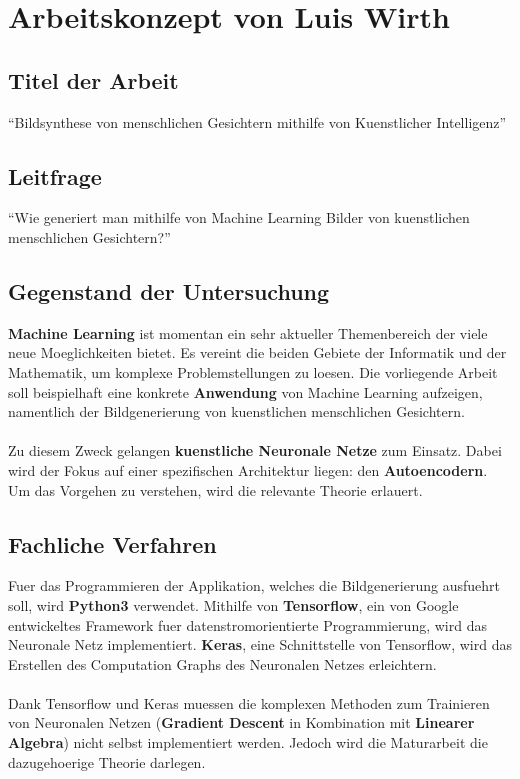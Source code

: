 \documentclass[12pt, a4paper]{article}
\begin{document}
\section*{Arbeitskonzept von Luis Wirth}

\subsection*{Titel der Arbeit}
``Bildsynthese von menschlichen Gesichtern mithilfe von Kuenstlicher Intelligenz''

\subsection*{Leitfrage}
``Wie generiert man mithilfe von Machine Learning Bilder von kuenstlichen menschlichen Gesichtern?''

\subsection*{Gegenstand der Untersuchung}
\textbf{Machine Learning} ist momentan ein sehr aktueller Themenbereich der viele neue Moeglichkeiten bietet.
Es vereint die beiden Gebiete der Informatik und der Mathematik, um komplexe Problemstellungen zu loesen.
Die vorliegende Arbeit soll beispielhaft eine konkrete \textbf{Anwendung} von Machine Learning aufzeigen, namentlich der Bildgenerierung von kuenstlichen menschlichen Gesichtern.
\\\\
Zu diesem Zweck gelangen \textbf{kuenstliche Neuronale Netze} zum Einsatz. Dabei wird der Fokus auf einer spezifischen Architektur liegen: den \textbf{Autoencodern}.
Um das Vorgehen zu verstehen, wird die relevante Theorie erlauert.

\subsection*{Fachliche Verfahren}
Fuer das Programmieren der Applikation, welches die Bildgenerierung ausfuehrt soll, wird \textbf{Python3} verwendet.
Mithilfe von \textbf{Tensorflow}, ein von Google entwickeltes Framework fuer datenstromorientierte Programmierung, wird das Neuronale Netz implementiert.
\textbf{Keras}, eine Schnittstelle von Tensorflow, wird das Erstellen des Computation Graphs des Neuronalen Netzes erleichtern. 
\\\\
Dank Tensorflow und Keras muessen die komplexen Methoden zum Trainieren von Neuronalen Netzen (\textbf{Gradient Descent} in Kombination mit  \textbf{Linearer Algebra}) nicht selbst implementiert werden.
Jedoch wird die Maturarbeit die dazugehoerige Theorie darlegen.
\end{document}
